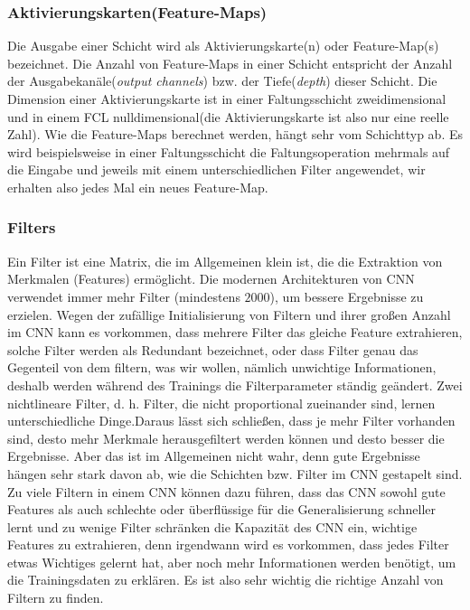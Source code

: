 \documentclass[12pt,a4paper]{scrartcl}
\numberwithin{equation}{section}
\begin{document}
\subsubsection{Aktivierungskarten(Feature-Maps)}
Die Ausgabe einer Schicht wird als Aktivierungskarte(n) oder Feature-Map(s) bezeichnet. Die Anzahl von Feature-Maps in einer Schicht entspricht der Anzahl der Ausgabekanäle(\textit{output channels}) bzw. der Tiefe(\textit{depth}) dieser Schicht. Die Dimension einer Aktivierungskarte ist in einer Faltungsschicht zweidimensional und in einem \ac{FCL} nulldimensional(die Aktivierungskarte ist also nur eine reelle Zahl). Wie die Feature-Maps berechnet werden, hängt sehr vom Schichttyp ab. Es wird beispielsweise in einer Faltungsschicht die Faltungsoperation mehrmals auf die Eingabe und jeweils mit einem unterschiedlichen Filter angewendet, wir erhalten also jedes Mal ein neues Feature-Map.

\subsubsection{Filters}\label{Filter}
Ein Filter ist eine Matrix, die im Allgemeinen  klein ist, die die Extraktion von Merkmalen (Features) ermöglicht. Die modernen Architekturen von \ac{CNN} verwendet immer mehr Filter (mindestens $ 2000 $), um bessere Ergebnisse zu erzielen. Wegen der zufällige Initialisierung von Filtern und ihrer großen Anzahl im \ac{CNN} kann es vorkommen, dass mehrere Filter das gleiche Feature extrahieren, solche Filter werden als Redundant bezeichnet, oder dass Filter genau das Gegenteil von dem filtern, was wir wollen, nämlich unwichtige Informationen, deshalb werden während des Trainings die Filterparameter ständig geändert. Zwei nichtlineare Filter, d. h. Filter, die nicht proportional zueinander sind, lernen unterschiedliche Dinge.Daraus lässt sich schließen, dass je mehr Filter vorhanden sind, desto mehr Merkmale herausgefiltert werden können und desto besser die Ergebnisse. Aber das ist im Allgemeinen nicht wahr, denn gute Ergebnisse hängen sehr stark davon ab, wie die Schichten bzw. Filter im CNN gestapelt sind. Zu viele Filtern in einem \ac{CNN} können dazu führen, dass das \ac{CNN} sowohl gute Features als auch schlechte oder überflüssige für die Generalisierung schneller lernt und zu wenige Filter schränken die Kapazität des \ac{CNN} ein,  wichtige Features zu extrahieren, denn irgendwann wird es vorkommen, dass jedes Filter etwas Wichtiges gelernt hat, aber noch mehr Informationen werden benötigt, um die Trainingsdaten zu erklären. Es ist also sehr wichtig die richtige Anzahl von Filtern zu finden.
\end{document}
